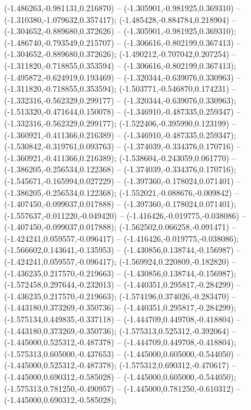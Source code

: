  (-1.486263,-0.981131,0.216870) -- (-1.305901,-0.981925,0.369310) -- (-1.310380,-1.079632,0.357417);
 (-1.485428,-0.884784,0.218904) -- (-1.304652,-0.889680,0.372626) -- (-1.305901,-0.981925,0.369310);
 (-1.486740,-0.793549,0.215707) -- (-1.306616,-0.802199,0.367413) -- (-1.304652,-0.889680,0.372626);
 (-1.490212,-0.707042,0.207254) -- (-1.311820,-0.718855,0.353594) -- (-1.306616,-0.802199,0.367413);
 (-1.495872,-0.624919,0.193469) -- (-1.320344,-0.639076,0.330963) -- (-1.311820,-0.718855,0.353594);
 (-1.503771,-0.546870,0.174231) -- (-1.332316,-0.562329,0.299177) -- (-1.320344,-0.639076,0.330963);
 (-1.513320,-0.471644,0.150078) -- (-1.346910,-0.487335,0.259347) -- (-1.332316,-0.562329,0.299177);
 (-1.522406,-0.395990,0.123199) -- (-1.360921,-0.411366,0.216389) -- (-1.346910,-0.487335,0.259347);
 (-1.530842,-0.319761,0.093763) -- (-1.374039,-0.334376,0.170716) -- (-1.360921,-0.411366,0.216389);
 (-1.538604,-0.243059,0.061770) -- (-1.386205,-0.256534,0.122368) -- (-1.374039,-0.334376,0.170716);
 (-1.545671,-0.165994,0.027229) -- (-1.397360,-0.178024,0.071401) -- (-1.386205,-0.256534,0.122368);
 (-1.552021,-0.088676,-0.009842) -- (-1.407450,-0.099037,0.017888) -- (-1.397360,-0.178024,0.071401);
 (-1.557637,-0.011220,-0.049420) -- (-1.416426,-0.019775,-0.038086) -- (-1.407450,-0.099037,0.017888);
 (-1.562502,0.066258,-0.091471) -- (-1.424241,0.059557,-0.096417) -- (-1.416426,-0.019775,-0.038086);
 (-1.566602,0.143641,-0.135953) -- (-1.430856,0.138744,-0.156987) -- (-1.424241,0.059557,-0.096417);
 (-1.569924,0.220809,-0.182820) -- (-1.436235,0.217570,-0.219663) -- (-1.430856,0.138744,-0.156987);
 (-1.572458,0.297644,-0.232013) -- (-1.440351,0.295817,-0.284299) -- (-1.436235,0.217570,-0.219663);
 (-1.574196,0.374026,-0.283470) -- (-1.443180,0.373269,-0.350736) -- (-1.440351,0.295817,-0.284299);
 (-1.575134,0.449835,-0.337118) -- (-1.444709,0.449708,-0.418804) -- (-1.443180,0.373269,-0.350736);
 (-1.575313,0.525312,-0.392064) -- (-1.445000,0.525312,-0.487378) -- (-1.444709,0.449708,-0.418804);
 (-1.575313,0.605000,-0.437653) -- (-1.445000,0.605000,-0.544050) -- (-1.445000,0.525312,-0.487378);
 (-1.575312,0.690312,-0.470617) -- (-1.445000,0.690312,-0.585028) -- (-1.445000,0.605000,-0.544050);
 (-1.575313,0.781250,-0.490957) -- (-1.445000,0.781250,-0.610312) -- (-1.445000,0.690312,-0.585028);
